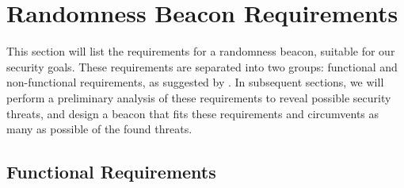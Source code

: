 \section{Randomness Beacon Requirements}
\label{sec:beacon_requirements}

This section will list the requirements for a randomness beacon, suitable for our security goals.
These requirements are separated into two groups: functional and non-functional requirements, as suggested by \citet[sec.\ 1.4.1]{swebok}.
In subsequent sections, we will perform a preliminary analysis of these requirements to reveal possible security threats, and design a beacon that fits these requirements and circumvents as many as possible of the found threats.

\subsection{Functional Requirements}
\label{sub:functional_requirements}
